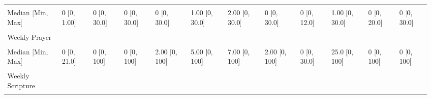 \documentclass[
  single column]{article}
\begin{document}
\begin{landscape}
\begin{longtable}[t]{llllllllllll}
\cellcolor{gray!10}{Mean (SD)} & \cellcolor{gray!10}{0.0000464 (0.00681)} & \cellcolor{gray!10}{1.09 (2.58)} & \cellcolor{gray!10}{1.66 (5.52)} & \cellcolor{gray!10}{1.81 (3.91)} & \cellcolor{gray!10}{2.38 (3.47)} & \cellcolor{gray!10}{3.13 (4.61)} & \cellcolor{gray!10}{1.60 (4.49)} & \cellcolor{gray!10}{1.36 (2.33)} & \cellcolor{gray!10}{5.19 (8.51)} & \cellcolor{gray!10}{0.982 (1.97)} & \cellcolor{gray!10}{1.65 (5.10)}\\
Median [Min, Max] & 0 [0, 1.00] & 0 [0, 30.0] & 0 [0, 30.0] & 0 [0, 30.0] & 1.00 [0, 30.0] & 2.00 [0, 30.0] & 0 [0, 30.0] & 0 [0, 12.0] & 1.00 [0, 30.0] & 0 [0, 20.0] & 0 [0, 30.0]\\
\addlinespace
\cellcolor{gray!10}{Missing} & \cellcolor{gray!10}{0 (0\%)} & \cellcolor{gray!10}{0 (0\%)} & \cellcolor{gray!10}{0 (0\%)} & \cellcolor{gray!10}{0 (0\%)} & \cellcolor{gray!10}{0 (0\%)} & \cellcolor{gray!10}{0 (0\%)} & \cellcolor{gray!10}{0 (0\%)} & \cellcolor{gray!10}{0 (0\%)} & \cellcolor{gray!10}{8 (1.2\%)} & \cellcolor{gray!10}{0 (0\%)} & \cellcolor{gray!10}{0 \vphantom{2} (0\%)}\\
Weekly Prayer &  &  &  &  &  &  &  &  &  &  & \\
\cellcolor{gray!10}{Mean (SD)} & \cellcolor{gray!10}{0.00348 (0.253)} & \cellcolor{gray!10}{2.89 (6.12)} & \cellcolor{gray!10}{3.50 (7.70)} & \cellcolor{gray!10}{4.25 (7.96)} & \cellcolor{gray!10}{8.71 (14.4)} & \cellcolor{gray!10}{9.51 (14.7)} & \cellcolor{gray!10}{4.93 (10.2)} & \cellcolor{gray!10}{3.62 (6.95)} & \cellcolor{gray!10}{20.7 (17.5)} & \cellcolor{gray!10}{3.39 (8.56)} & \cellcolor{gray!10}{4.54 (10.6)}\\
Median [Min, Max] & 0 [0, 21.0] & 0 [0, 100] & 0 [0, 100] & 2.00 [0, 100] & 5.00 [0, 100] & 7.00 [0, 100] & 2.00 [0, 100] & 0 [0, 30.0] & 25.0 [0, 100] & 0 [0, 100] & 0 [0, 100]\\
\cellcolor{gray!10}{Missing} & \cellcolor{gray!10}{0 (0\%)} & \cellcolor{gray!10}{0 (0\%)} & \cellcolor{gray!10}{0 (0\%)} & \cellcolor{gray!10}{0 (0\%)} & \cellcolor{gray!10}{0 (0\%)} & \cellcolor{gray!10}{0 (0\%)} & \cellcolor{gray!10}{0 (0\%)} & \cellcolor{gray!10}{0 (0\%)} & \cellcolor{gray!10}{8 (1.2\%)} & \cellcolor{gray!10}{0 (0\%)} & \cellcolor{gray!10}{0 \vphantom{1} (0\%)}\\
\addlinespace
Weekly Scripture &  &  &  &  &  &  &  &  &  &  & \\
\cellcolor{gray!10}{Mean (SD)} & \cellcolor{gray!10}{0 (0)} & \cellcolor{gray!10}{0.920 (2.41)} & \cellcolor{gray!10}{1.50 (3.10)} & \cellcolor{gray!10}{1.20 (3.83)} & \cellcolor{gray!10}{3.54 (5.26)} & \cellcolor{gray!10}{4.24 (6.67)} & \cellcolor{gray!10}{1.49 (3.14)} & \cellcolor{gray!10}{1.78 (5.15)} & \cellcolor{gray!10}{5.09 (10.9)} & \cellcolor{gray!10}{1.24 (4.82)} & \cellcolor{gray!10}{1.24 (3.51)}\\

\end{longtable}
\end{landscape}
\end{document}
